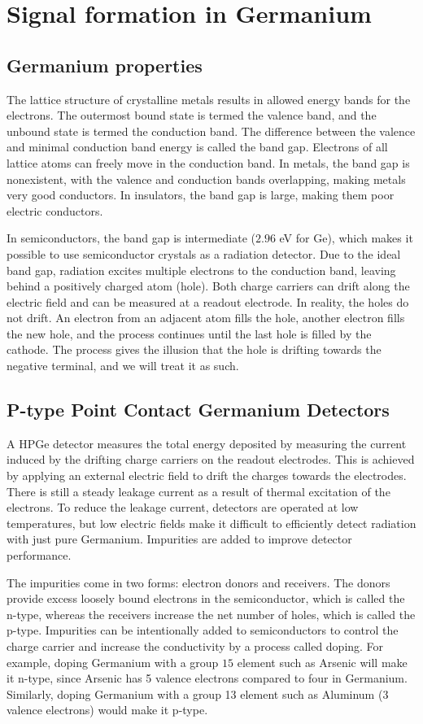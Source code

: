 \section{Signal formation in Germanium}
\subsection{Germanium properties}
The lattice structure of crystalline metals results in allowed energy bands for the electrons. The outermost bound state is termed the valence band, and the unbound state is termed the conduction band. The difference between the valence and minimal conduction band energy is called the band gap. Electrons of all lattice atoms can freely move in the conduction band. In metals, the band gap is nonexistent, with the valence and conduction bands overlapping, making metals very good conductors. In insulators, the band gap is large, making them poor electric conductors.

In semiconductors, the band gap is intermediate ($2.96$ eV for Ge), which makes it possible to use semiconductor crystals as a radiation detector. Due to the ideal band gap, radiation excites multiple electrons to the conduction band, leaving behind a positively charged atom (hole). Both charge carriers can drift along the electric field and can be measured at a readout electrode. In reality, the holes do not drift. An electron from an adjacent atom fills the hole, another electron fills the new hole, and the process continues until the last hole is filled by the cathode. The process gives the illusion that the hole is drifting towards the negative terminal, and we will treat it as such. 

\subsection{P-type Point Contact Germanium Detectors}
A HPGe detector measures the total energy deposited by measuring the current induced by the drifting charge carriers on the readout electrodes. This is achieved by applying an external electric field to drift the charges towards the electrodes. There is still a steady leakage current as a result of thermal excitation of the electrons. To reduce the leakage current, detectors are operated at low temperatures, but low electric fields make it difficult to efficiently detect radiation with just pure Germanium. Impurities are added to improve detector performance.

The impurities come in two forms: electron donors and receivers. The donors provide excess loosely bound electrons in the semiconductor, which is called the n-type, whereas the receivers increase the net number of holes, which is called the p-type. Impurities can be intentionally added to semiconductors to control the charge carrier and increase the conductivity by a process called doping. For example, doping Germanium with a group $15$ element such as Arsenic will make it n-type, since Arsenic has 5 valence electrons compared to four in Germanium. Similarly, doping Germanium with a group 13 element such as Aluminum (3 valence electrons) would make it p-type.

